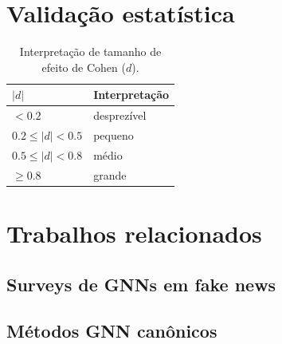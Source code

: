 \section{Valida\c{c}\~ao estat\'istica}
\label{sec:estatistica}

%
%

\begin{table}[h]\centering
\caption{Interpreta\c{c}\~ao de tamanho de efeito de Cohen ($d$).}
\label{tab:cohen_d_interpretacao}
\begin{tabular}{ll}
\toprule
$|d|$           & Interpreta\c{c}\~ao \\
\midrule
$< 0.2$         & desprez\'ivel \\
$0.2 \leq |d| < 0.5$ & pequeno \\
$0.5 \leq |d| < 0.8$ & m\'edio \\
$\geq 0.8$      & grande \\
\bottomrule
\end{tabular}
\end{table}

\section{Trabalhos relacionados}
\label{sec:relacionados}


\subsection{Surveys de GNNs em fake news}
\label{sec:surveys}

\subsection{M\'etodos GNN can\^onicos}
\label{sec:metodos_canonicos}

